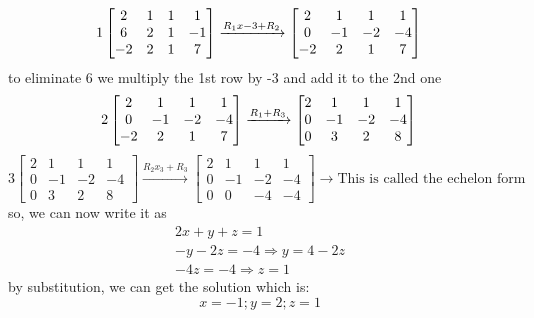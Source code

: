 \documentclass{article}
\begin{document}
\begin{example}
    \[
    1
    \begin{bmatrix}
        2&1&1&1\\ 6&2&1&-1\\ -2&2&1&7
    \end{bmatrix} \xrightarrow{R_1x-3+R_2}
    \begin{bmatrix}
        2&1&1&1\\ 0&-1&-2&-4\\ -2&2&1&7
    \end{bmatrix}\\
    \]
to eliminate 6 we multiply the 1st row by -3 and add it to the 2nd one
     \[
     2
      \begin{bmatrix}
        2&1&1&1\\ 0&-1&-2&-4\\ -2&2&1&7
      \end{bmatrix}\xrightarrow{R_1+R_3}
      \begin{bmatrix}
          2&1&1&1\\ 0&-1&-2&-4\\ 0&3&2&8
      \end{bmatrix}\\
     \]
     \[
     3
     \begin{bmatrix}
          2&1&1&1\\ 0&-1&-2&-4\\ 0&3&2&8
      \end{bmatrix}\xrightarrow{R_2x_3+R_3}
      \begin{bmatrix}
           2&1&1&1\\ 0&-1&-2&-4\\ 0&0&-4&-4
      \end{bmatrix} \rightarrow \text{This is called the echelon form }
     \]
so, we can now write it as
\begin{align*}
        2x+y+z=1\\
        -y-2z=-4 \Rightarrow y=4-2z\\ 
        -4z=-4 \Rightarrow z=1
\end{align*}
by substitution, we can get the solution which is:
\[ x=-1  ;  y=2   ;  z=1 \]
\end{example}
\end{document}
